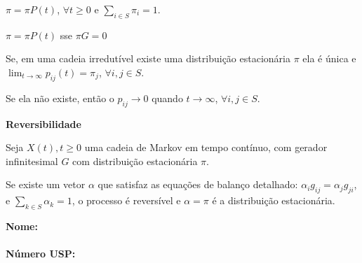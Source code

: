 \documentclass[12pt]{article}
\begin{document}
\begin{multicols}{3}
		$ \pi = \pi P(t) $, $ \forall t \geq 0 $ e $ \sum_{i \in S} \pi_i = 1 $.
		
		$ \pi = \pi P(t) $ sse $ \pi G = 0 $
		
		Se, em uma cadeia irredutível existe uma distribuição estacionária $ \pi $ ela é única e $\lim_{t\to\infty} p_{ij}(t) = \pi_j$, $ \forall i, j \in S $.
		
		Se ela não existe, então o $ p_{ij} \to 0 $ quando $ t \to \infty $, $ \forall i, j \in S $.
		
		\noindent\makebox[\columnwidth]{\rule{\columnwidth}{0.4pt}}
		
		\textbf{Reversibilidade}
		
		Seja $ {X(t), t \geq 0} $ uma cadeia de Markov em tempo contínuo, com gerador infinitesimal $ G $ com distribuição estacionária $ \pi $. 
		
		Se existe um vetor $ \alpha $ que satisfaz as equações de balanço detalhado: $ \alpha_i g_{ij} = \alpha_j g_{ji} $, e $ \sum_{k \in S} \alpha_k = 1 $, o processo é reversível e $ \alpha = \pi $ é a distribuição estacionária.
		
	\end{multicols}
	
	\textbf{Nome:}\\ \\
	\textbf{Número USP:}

	  
\end{document}
